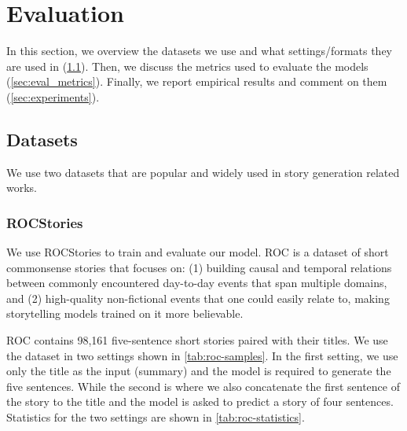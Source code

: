 \chapter{Evaluation}
\label{ch:evaluation}



In this section, we overview the datasets we use and what settings/formats they are used in (\cref{sec:datasets}). Then, we discuss the metrics used to evaluate the models (\cref{sec:eval_metrics}). Finally, we report empirical results and comment on them (\cref{sec:experiments}).

\section{Datasets}
\label{sec:datasets}

We use two datasets that are popular and widely used in story generation related works.

\subsection{ROCStories}
\label{sec:roc_stories}

We use ROCStories \cite[ROC]{mostafazadeh2016corpus} to train and evaluate our model. ROC is a dataset of short commonsense stories that focuses on: (1) building causal and temporal relations between commonly encountered day-to-day events that span multiple domains, and (2) high-quality non-fictional events that one could easily relate to, making storytelling models trained on it more believable.

ROC contains 98,161 five-sentence short stories paired with their titles. We use the dataset in two settings shown in \cref{tab:roc-samples}. In the first setting, we use only the title as the input (summary) and the model is required to generate the five sentences. While the second is where we also concatenate the first sentence of the story to the title and the model is asked to predict a story of four sentences. Statistics for the two settings are shown in \cref{tab:roc-statistics}.

